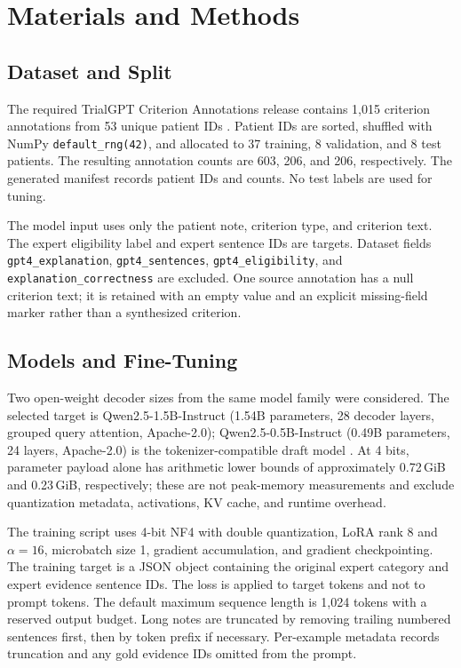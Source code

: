 \documentclass[conference]{IEEEtran}
\begin{document}
\section{Materials and Methods}
\subsection{Dataset and Split}
The required TrialGPT Criterion Annotations release contains 1,015 criterion
annotations from 53 unique patient IDs \cite{trialgpt_dataset}. Patient IDs are sorted,
shuffled with NumPy \texttt{default\_rng(42)}, and allocated to 37 training, 8
validation, and 8 test patients. The resulting annotation counts are 603, 206, and
206, respectively. The generated manifest records patient IDs and counts. No test
labels are used for tuning.

The model input uses only the patient note, criterion type, and criterion text. The
expert eligibility label and expert sentence IDs are targets. Dataset fields
\texttt{gpt4\_explanation}, \texttt{gpt4\_sentences}, \texttt{gpt4\_eligibility}, and
\texttt{explanation\_correctness} are excluded. One source annotation has a null
criterion text; it is retained with an empty value and an explicit missing-field
marker rather than a synthesized criterion.

\subsection{Models and Fine-Tuning}
Two open-weight decoder sizes from the same model family were considered. The
selected target is Qwen2.5-1.5B-Instruct (1.54B parameters, 28 decoder layers, grouped
query attention, Apache-2.0); Qwen2.5-0.5B-Instruct (0.49B parameters, 24 layers,
Apache-2.0) is the tokenizer-compatible draft model
\cite{qwen25_15b_modelcard,qwen25_05b_modelcard}. At 4 bits, parameter payload alone
has arithmetic lower bounds of approximately 0.72\,GiB and 0.23\,GiB, respectively;
these are not peak-memory measurements and exclude quantization metadata, activations,
KV cache, and runtime overhead.

The training script uses 4-bit NF4 with double quantization, LoRA rank 8 and
$\alpha=16$, microbatch size 1, gradient accumulation, and gradient checkpointing.
The training target is a JSON object containing the original expert category and
expert evidence sentence IDs. The loss is applied to target tokens and not to prompt
tokens. The default maximum sequence length is 1,024 tokens with a reserved output
budget. Long notes are truncated by removing trailing numbered sentences first, then
by token prefix if necessary. Per-example metadata records truncation and any gold
evidence IDs omitted from the prompt.
\end{document}
